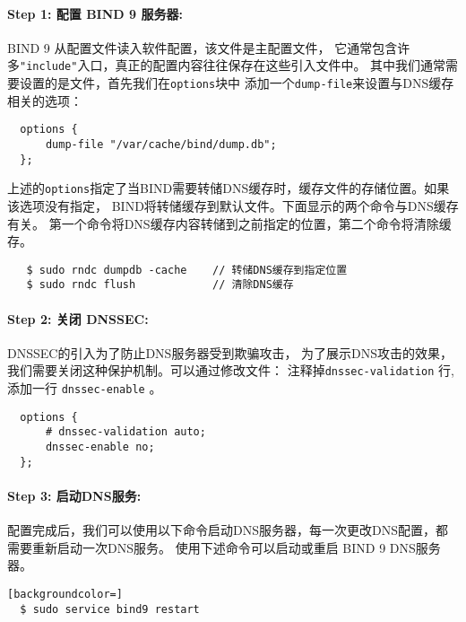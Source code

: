 \paragraph{Step 1: 配置 BIND 9 服务器:}
BIND 9 从配置文件读入软件配置，该文件是主配置文件，
它通常包含许多\texttt{"include"}入口，真正的配置内容往往保存在这些引入文件中。
其中我们通常需要设置的是文件，首先我们在\texttt{options}块中
添加一个\texttt{dump-file}来设置与DNS缓存相关的选项：

\begin{lstlisting}
  options {
      dump-file "/var/cache/bind/dump.db";
  };
\end{lstlisting}


上述的\texttt{options}指定了当BIND需要转储DNS缓存时，缓存文件的存储位置。如果该选项没有指定，
BIND将转储缓存到默认文件。下面显示的两个命令与DNS缓存有关。
第一个命令将DNS缓存内容转储到之前指定的位置，第二个命令将清除缓存。


\begin{lstlisting}
   $ sudo rndc dumpdb -cache    // 转储DNS缓存到指定位置
   $ sudo rndc flush            // 清除DNS缓存
\end{lstlisting}


\paragraph{Step 2: 关闭 DNSSEC:}
DNSSEC的引入为了防止DNS服务器受到欺骗攻击，
为了展示DNS攻击的效果，我们需要关闭这种保护机制。可以通过修改文件：
注释掉{\tt dnssec-validation} 行,添加一行
{\tt dnssec-enable} 。

\begin{lstlisting}
  options {
      # dnssec-validation auto;
      dnssec-enable no;
  };
\end{lstlisting}


\paragraph{Step 3: 启动DNS服务:}
配置完成后，我们可以使用以下命令启动DNS服务器，每一次更改DNS配置，都需要重新启动一次DNS服务。
使用下述命令可以启动或重启 BIND 9 DNS服务器。

\begin{lstlisting}[backgroundcolor=]
  $ sudo service bind9 restart
\end{lstlisting}


